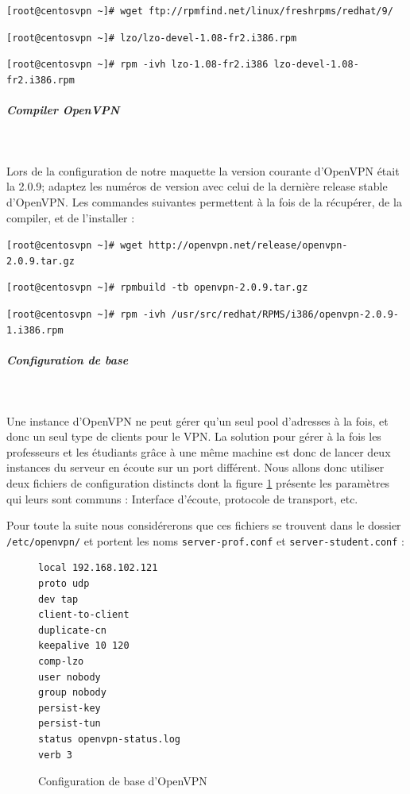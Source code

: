 \verb|[root@centosvpn ~]# wget ftp://rpmfind.net/linux/freshrpms/redhat/9/|

\verb|[root@centosvpn ~]# lzo/lzo-devel-1.08-fr2.i386.rpm|

\verb|[root@centosvpn ~]# rpm -ivh lzo-1.08-fr2.i386 lzo-devel-1.08-fr2.i386.rpm|

\subparagraph{Compiler OpenVPN}
~

Lors de la configuration de notre maquette la version courante d'OpenVPN était la 2.0.9; adaptez les numéros de version avec celui de la dernière release stable d'OpenVPN. Les commandes suivantes permettent à la fois de la récupérer, de la compiler, et de l'installer :

\verb|[root@centosvpn ~]# wget http://openvpn.net/release/openvpn-2.0.9.tar.gz|

\verb|[root@centosvpn ~]# rpmbuild -tb openvpn-2.0.9.tar.gz|

\verb|[root@centosvpn ~]# rpm -ivh /usr/src/redhat/RPMS/i386/openvpn-2.0.9-1.i386.rpm|

\subparagraph{Configuration de base}
~

Une instance d'OpenVPN ne peut gérer qu'un seul pool d'adresses à la fois, et donc un seul type de clients pour le VPN. La solution pour gérer à la fois les professeurs et les étudiants grâce à une même machine est donc de lancer deux instances du serveur en écoute sur un port différent. Nous allons donc utiliser deux fichiers de configuration distincts dont la figure \ref{configuration_base_openvpn} présente les paramètres qui leurs sont communs : Interface d'écoute, protocole de transport, etc.

Pour toute la suite nous considérerons que ces fichiers se trouvent dans le dossier \texttt{/etc/openvpn/} et portent les noms \texttt{server-prof.conf} et \texttt{server-student.conf} :

\begin{figure}[H]
	\begin{center}
		\begin{minipage}{0.90\textwidth}
			\begin{lstlisting}[frame=trBL]
local 192.168.102.121
proto udp
dev tap
client-to-client
duplicate-cn
keepalive 10 120
comp-lzo
user nobody
group nobody
persist-key
persist-tun
status openvpn-status.log
verb 3
			\end{lstlisting}
		\end{minipage}
	\end{center}
	\caption{Configuration de base d'OpenVPN}
	\label{configuration_base_openvpn}
\end{figure}

